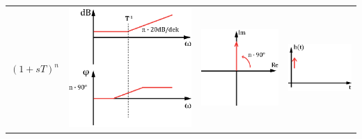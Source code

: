 \begin{tabular}{>{\centering\arraybackslash}p{1.5cm}|>{\centering\arraybackslash}p{2.5cm}|>{\centering\arraybackslash}p{2cm}|>{\centering\arraybackslash}p{2.5cm}}
\hline \rule[-2ex]{0pt}{5.5ex} $(1+sT)^n$ & \includegraphics[scale = 0.3]{../fig/bode_1stn.eps} & \includegraphics[scale = 0.4]{../fig/ort_1stn.eps}  & \includegraphics[scale = 0.5]{../fig/spr_1stn.eps} \\ 

\end{tabular}
